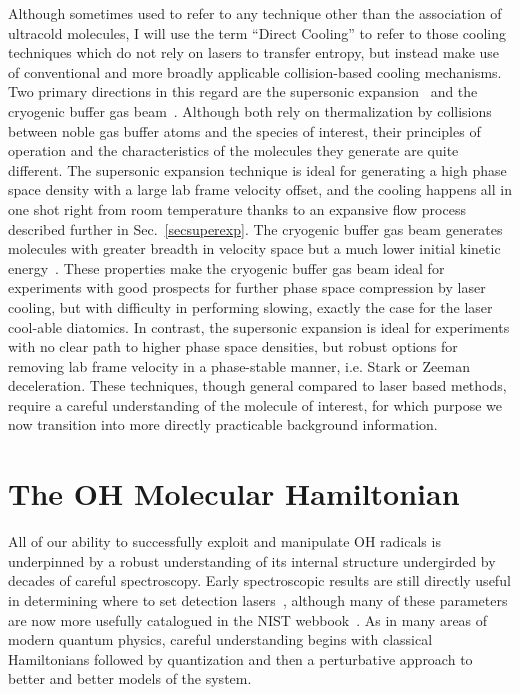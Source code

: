 Although sometimes used to refer to any technique other than the association of ultracold molecules, I will use the term ``Direct Cooling'' to refer to those cooling techniques which do not rely on lasers to transfer entropy, but instead make use of conventional and more broadly applicable collision-based cooling mechanisms.
Two primary directions in this regard are the supersonic expansion~\cite{Miller1988} and the cryogenic buffer gas beam~\cite{Hutzler2011a}.
Although both rely on thermalization by collisions between noble gas buffer atoms and the species of interest, their principles of operation and the characteristics of the molecules they generate are quite different.
The supersonic expansion technique is ideal for generating a high phase space density with a large lab frame velocity offset, and the cooling happens all in one shot right from room temperature thanks to an expansive flow process described further in Sec.~\ref{secsuperexp}.
The cryogenic buffer gas beam generates molecules with greater breadth in velocity space but a much lower initial kinetic energy~\citep[Fig.~1]{Hutzler2011a}.
These properties make the cryogenic buffer gas beam ideal for experiments with good prospects for further phase space compression by laser cooling, but with difficulty in performing slowing, exactly the case for the laser cool-able diatomics.
In contrast, the supersonic expansion is ideal for experiments with no clear path to higher phase space densities, but robust options for removing lab frame velocity in a phase-stable manner, i.e. Stark or Zeeman deceleration.
These techniques, though general compared to laser based methods, require a careful understanding of the molecule of interest, for which purpose we now transition into more directly practicable background information.

\section{The OH Molecular Hamiltonian}

All of our ability to successfully exploit and manipulate OH radicals is underpinned by a robust understanding of its internal structure undergirded by decades of careful spectroscopy.
Early spectroscopic results are still directly useful in determining where to set detection lasers~\cite{Meerts1975}, although many of these parameters are now more usefully catalogued in the NIST webbook~\cite{Huber2018}.
As in many areas of modern quantum physics, careful understanding begins with classical Hamiltonians followed by quantization and then a perturbative approach to better and better models of the system. 

